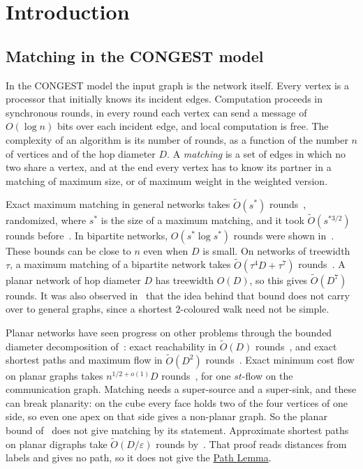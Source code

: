 \documentclass[11pt]{article}
\theoremstyle{definition}
\theoremstyle{remark}
\theoremstyle{plain}
\newcommand{\LemPath}{\hyperref[lem:path]{Path Lemma}}
\newcommand{\Ot}{\tilde O}
\begin{document}
\section{Introduction}

\subsection{Matching in the CONGEST model}

In the CONGEST model the input graph is the network itself. Every vertex is a processor that
initially knows its incident edges. Computation proceeds in synchronous rounds, in every round each
vertex can send a message of $O(\log n)$ bits over each incident edge, and local computation is free.
The complexity of an algorithm is its number of rounds, as a function of the number $n$ of vertices
and of the hop diameter $D$. A \emph{matching} is a set of edges in which no two share a vertex, and
at the end every vertex has to know its partner in a matching of maximum size, or of maximum
weight in the weighted version.

Exact maximum matching in general networks takes $\Ot(s^*)$ rounds~\cite{IKY23}, randomized, where
$s^*$ is the size of a maximum matching, and it took $\Ot(s^{*3/2})$ rounds before~\cite{KI21}. In
bipartite networks, $O(s^*\log s^*)$ rounds were shown in~\cite{AKO18}. These bounds can be close to
$n$ even when $D$ is small. On networks of treewidth $\tau$, a maximum matching of a bipartite network
takes $\Ot(\tau^4D+\tau^7)$ rounds~\cite[Theorem~4]{IKNS22}. A planar network of hop diameter $D$
has treewidth $O(D)$, so this gives $\Ot(D^7)$ rounds. It was also observed in~\cite{IKNS22} that the
idea behind that bound does not carry over to general graphs, since a shortest $2$-coloured walk need
not be simple.

Planar networks have seen progress on other problems through the bounded diameter decomposition
of~\cite{LP19}: exact reachability in $\Ot(D)$ rounds~\cite{P20}, and exact shortest paths and
maximum flow in $\Ot(D^2)$ rounds~\cite{LP19,P20,ADPW25}. Exact minimum cost flow on planar graphs
takes $n^{1/2+o(1)}D$ rounds~\cite{dV23}, for one $st$-flow on the communication graph. Matching
needs a super-source and a super-sink, and these can break planarity: on the cube every face holds
two of the four vertices of one side, so even one apex on that side gives a non-planar graph. So the planar bound of~\cite{dV23} does not give matching by its statement. Approximate shortest paths on
planar digraphs take $\Ot(D/\varepsilon)$ rounds by~\cite{LTY26}. That proof reads distances from labels and gives no
path, so it does not give the \LemPath{}.
\end{document}
